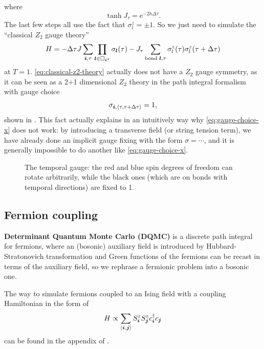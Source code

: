 \documentclass[hyperref, a4paper]{article}
\newcommand*{\ee}{\mathrm{e}}
\newcommand*{\pair}[1]{\langle #1 \rangle}
\newcommand*{\concept}[1]{{\textbf{#1}}}
\newcommand*{\Ztwo}{\texorpdfstring{$\mathbb{Z}_2$ }{Z2 }}
\def\mathbb#1{#1}%
\begin{document}
where 
\begin{equation}
    \tanh J_\tau = \ee^{-2 h \Delta \tau}.
\end{equation}
The last few steps all use the fact that $\sigma^z_l = \pm 1$.
So we just need to simulate the ``classical \Ztwo gauge theory''
\begin{equation}
    H = - \Delta \tau J \sum_{\vb*{i}, \tau} \prod_{\vb*{l} \in \Box_{\vb*{i}^*}} \sigma_{\vb*{l}}(\tau) 
    - J_\tau \sum_{\text{bond $\vb*{l}$}, \tau} \sigma_l^z(\tau) \sigma_l^z(\tau + \Delta \tau)
    \label{eq:classical-z2-theory}
\end{equation}
at $T = 1$. \eqref{eq:classical-z2-theory} actually does not have a \Ztwo gauge symmetry, as it can be seen as a 2+1 dimensional \Ztwo theory in the path integral formalism with gauge choice
\begin{equation}
    \sigma_{\vb*{i}, \pair{\tau, \tau + \Delta \tau}} = 1,
\end{equation}
shown in .
This fact actually explains in an intuitively way why \eqref{eq:gauge-choice-x} does not work:
by introducing a transverse field (or string tension term), we have already done an implicit gauge fixing with the form $\sigma=\cdots$, and it is generally impossible to do another like \eqref{eq:gauge-choice-x}.

\begin{figure}
    \centering
    
    \caption{The temporal gauge: the red and blue spin degrees of freedom can rotate arbitrarily, while the black ones (which are on bonds with temporal directions) are fixed to 1. }
    \label{fig:temporal-gauge}
\end{figure}

\subsection{Fermion coupling}

\concept{Determinant Quantum Monte Carlo (DQMC)} is a discrete path integral for fermions, 
where an (bosonic) auxiliary field is introduced by Hubbard-Stratonovich transformation and Green functions of the fermions can be recast in terms of the auxiliary field, so we rephrase a fermionic problem into a bosonic one.

The way to simulate fermions coupled to an Ising field with a coupling Hamiltonian in the form of 
\begin{equation}
    H \propto \sum_{\pair{\vb*{i}, \vb*{j}}} S_{\vb*{i}}^z S_{\vb*{j}}^z c^\dagger_{\vb*{i}} c_{\vb*{j}}
\end{equation}
can be found in the appendix of \cite{Chen_2021}. 
\end{document}
